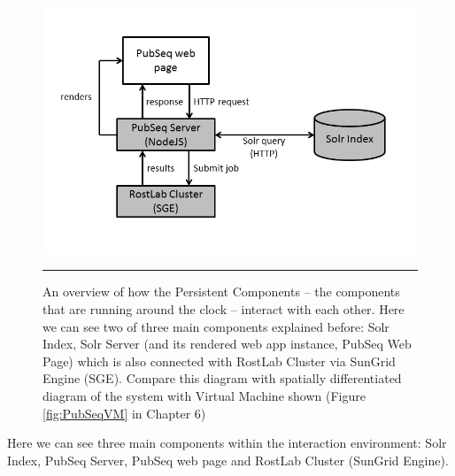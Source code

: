 \begin{figure}[htbp]
  \centering
    \includegraphics[width=6in]{Figures/solr_graph_main.png}
    \rule{35em}{0.5pt}
  \caption[An Overview of how the 'Persistent Components' of PubSeq environment interacts.]{An overview of how the Persistent Components -- the components that are running around the clock -- interact with each other. Here we can see two of three main components explained before: Solr Index, Solr Server (and its rendered web app instance, PubSeq Web Page) which is also connected with RostLab Cluster via SunGrid Engine (SGE). Compare this diagram with spatially differentiated diagram of the system with Virtual Machine shown (Figure \ref{fig:PubSeqVM} in Chapter 6)}
  \label{fig:ComponentInteraction}
\end{figure}

Here we can see three main components within the interaction environment: Solr Index, PubSeq Server, PubSeq web page and RostLab Cluster (SunGrid Engine).

